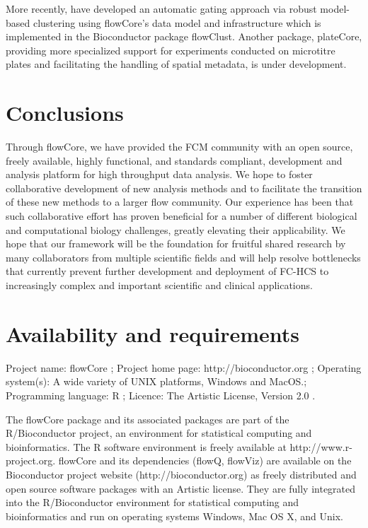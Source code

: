 \documentclass[10pt]{bmc_article}
\newcommand{\Rpackage}[1]{{\textsf{#1}}}
\newenvironment{bmcformat}{\begin{raggedright}\baselineskip20pt\sloppy\setboolean{publ}{false}}{\end{raggedright}\baselineskip20pt\sloppy}
\begin{document}
\begin{bmcformat}
More recently, \cite{lo2008agf} have developed an automatic gating
approach via robust model-based clustering using \Rpackage{flowCore}'s
data model and infrastructure which is implemented in the Bioconductor
package \Rpackage{flowClust}. Another package, \Rpackage{plateCore},
providing more specialized support for experiments conducted on
microtitre plates and facilitating the handling of spatial metadata,
is under development.
    

\section*{Conclusions}
Through \Rpackage{flowCore}, we have provided the FCM community with
an open source, freely available, highly functional, and standards
compliant, development and analysis platform for high throughput data
analysis.  We hope to foster collaborative development of new analysis
methods and to facilitate the transition of these new methods to a
larger flow community.  Our experience has been that such
collaborative effort has proven beneficial for a number of different
biological and computational biology challenges, greatly elevating
their applicability.  We hope that our framework will be the
foundation for fruitful shared research by many collaborators from
multiple scientific fields and will help resolve bottlenecks that
currently prevent further development and deployment of FC-HCS to
increasingly complex and important scientific and clinical
applications.

\section*{Availability and requirements}
Project name: flowCore ;
Project home page: http://bioconductor.org ;
Operating system(s): A wide variety of UNIX platforms, Windows and MacOS.;  
Programming language: R ;
Licence: The Artistic License, Version 2.0 .


The flowCore package and its associated packages are part of the
R/Bioconductor project, an environment for statistical computing and
bioinformatics. The R software environment is freely available at
http://www.r-project.org. flowCore and its dependencies (flowQ,
flowViz) are available on the Bioconductor project website
(http://bioconductor.org) as freely distributed and open source
software packages with an Artistic license. They are fully integrated
into the R/Bioconductor environment for statistical computing and
bioinformatics and run on operating systems Windows, Mac OS X, and
Unix.
    

\end{bmcformat}
\end{document}
